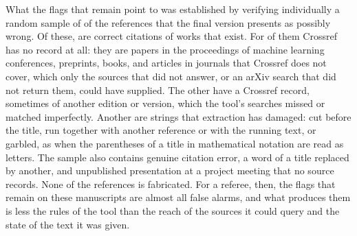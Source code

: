 \documentclass[pdflatex,sn-apa]{sn-jnl}
\begin{document}
What the flags that remain point to was established by verifying individually a random sample of \SampleN{} of the \CorpScrutNRev{} references that the final version presents as possibly wrong. Of these, \SampleCorrect{} are correct citations of works that exist. For \SampleCorrectNoCrossref{} of them Crossref has no record at all: they are papers in the proceedings of machine learning conferences, preprints, books, and articles in journals that Crossref does not cover, which only the sources that did not answer, or an arXiv search that did not return them, could have supplied. The other \SampleCorrectCrossref{} have a Crossref record, sometimes of another edition or version, which the tool's searches missed or matched imperfectly. Another \SampleDamage{} are strings that extraction has damaged: cut before the title, run together with another reference or with the running text, or garbled, as when the parentheses of a title in mathematical notation are read as letters. The sample also contains \SampleError{} genuine citation error, a word of a title replaced by another, and \SampleUnverifiable{} unpublished presentation at a project meeting that no source records. None of the references is fabricated. For a referee, then, the flags that remain on these manuscripts are almost all false alarms, and what produces them is less the rules of the tool than the reach of the sources it could query and the state of the text it was given.
\end{document}
